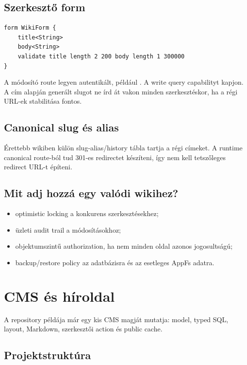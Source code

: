 \subsection*{Szerkesztő form}

\begin{lstlisting}[language=Velran]
form WikiForm {
    title<String>
    body<String>
    validate title length 2 200 body length 1 300000
}
\end{lstlisting}

A módosító route legyen autentikált, például . A write query  capabilityt kapjon. A cím alapján generált slugot ne írd át vakon minden szerkesztéskor, ha a régi URL-ek stabilitása fontos.

\subsection*{Canonical slug és alias}

Érettebb wikiben külön slug-alias/history tábla tartja a régi címeket. A runtime canonical route-ból tud 301-es redirectet készíteni, így nem kell tetszőleges redirect URL-t építeni.

\subsection*{Mit adj hozzá egy valódi wikihez?}

\begin{itemize}
  \item optimistic locking a konkurens szerkesztésekhez;
  \item üzleti audit trail a módosításokhoz;
  \item objektumszintű authorization, ha nem minden oldal azonos jogosultságú;
  \item backup/restore policy az adatbázisra és az esetleges AppFs adatra.
\end{itemize}


\section{CMS és híroldal}

A repository  példája már egy kis CMS magját mutatja: model, typed SQL, layout, Markdown, szerkesztői action és public cache.

\subsection*{Projektstruktúra}

